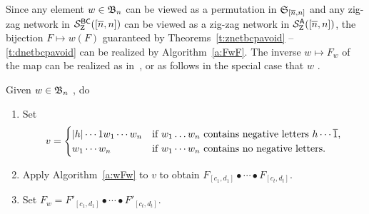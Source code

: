 \documentclass[11pt]{article}
\theoremstyle{definition}
\numberwithin{equation}{section}
\begin{document}
Since any element $w \in \mathfrak{B}_n$ \avoidingp{}
can be viewed as a permutation in $\mathfrak{S}_{[\overline{n},n]}$
and any zig-zag network in $\mathcal S^{\mathsf{BC}}_{\mathrm Z}([\overline{n},n])$
can be viewed as a zig-zag network in $\mathcal S^{\mathsf{A}}_{\mathrm Z}([\overline{n},n])$,
the bijection $F \mapsto w(F)$ guaranteed by
Theorems~\ref{t:znetbcpavoid} -- \ref{t:dnetbcpavoid}
can be realized by Algorithm~\ref{a:FwF}.
The inverse $w \mapsto F_w$
of the map can be realized as in~\cite[\S 3]{SkanNNDCB},
or as follows in the special case that $w$ \avoidssignedp.
\begin{alg}
  Given $w \in \mathfrak{B}_n$ \avoidingsignedp, do
  \begin{enumerate}
  \item Set
  \begin{equation*}
    v = \begin{cases}
      |h| \cdots 1 w_1 \cdots w_n
       &\text{if $w_1 \dotsc w_n$ contains negative letters $h \cdots \overline{1}$,}\\
      w_1 \cdots w_n
       &\text{if $w_1 \cdots w_n$ contains no negative letters}.
    \end{cases}
  \end{equation*}
  \item Apply Algorithm~\ref{a:wFw} to $v$ to obtain
      $F_{[c_1,d_1]} \bullet \cdots \bullet F_{[c_t,d_t]}$.
  \item Set $F_w = F'_{[c_1,d_1]} \bullet \cdots \bullet F'_{[c_t,d_t]}$.
  \end{enumerate}
\end{alg}
\end{document}
